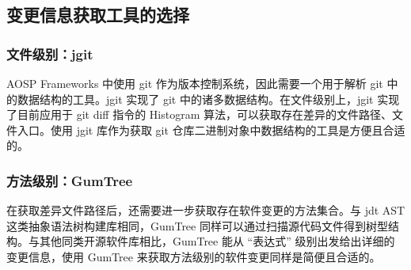 \subsection{变更信息获取工具的选择}

\subsubsection{文件级别：jgit}

AOSP Frameworks 中使用 git 作为版本控制系统，因此需要一个用于解析 git 中的数据结构的工具。jgit 实现了 git 中的诸多数据结构。在文件级别上，jgit 实现了目前应用于 git diff 指令的 Histogram 算法，可以获取存在差异的文件路径、文件入口。使用 jgit 库作为获取 git 仓库二进制对象中数据结构的工具是方便且合适的。

\subsubsection{方法级别：GumTree}

在获取差异文件路径后，还需要进一步获取存在软件变更的方法集合。与 jdt AST 这类抽象语法树构建库相同，GumTree 同样可以通过扫描源代码文件得到树型结构。与其他同类开源软件库相比，GumTree 能从 “表达式” 级别出发给出详细的变更信息，使用 GumTree 来获取方法级别的软件变更同样是简便且合适的。
